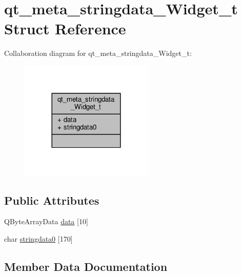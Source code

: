 \hypertarget{structqt__meta__stringdata__Widget__t}{}\section{qt\+\_\+meta\+\_\+stringdata\+\_\+\+Widget\+\_\+t Struct Reference}
\label{structqt__meta__stringdata__Widget__t}


Collaboration diagram for qt\+\_\+meta\+\_\+stringdata\+\_\+\+Widget\+\_\+t\+:
\nopagebreak
\begin{figure}[H]
\begin{center}
\leavevmode
\includegraphics[width=180pt]{structqt__meta__stringdata__Widget__t__coll__graph}
\end{center}
\end{figure}
\subsection*{Public Attributes}
\begin{DoxyCompactItemize}
\item 
Q\+Byte\+Array\+Data \hyperlink{structqt__meta__stringdata__Widget__t_a78d1ef2c88c612b9869c15ca2495286c}{data} \mbox{[}10\mbox{]}
\item 
char \hyperlink{structqt__meta__stringdata__Widget__t_af553fd7513d575f5b94576c0233766e4}{stringdata0} \mbox{[}170\mbox{]}
\end{DoxyCompactItemize}


\subsection{Member Data Documentation}
